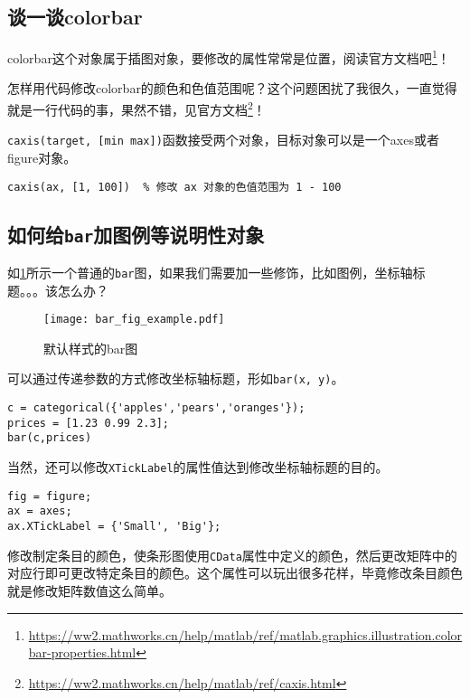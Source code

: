 \subsection{谈一谈colorbar}

colorbar这个对象属于插图对象，要修改的属性常常是位置，阅读官方文档吧\footnote{\url{https://ww2.mathworks.cn/help/matlab/ref/matlab.graphics.illustration.colorbar-properties.html}}！

怎样用代码修改colorbar的颜色和色值范围呢？这个问题困扰了我很久，一直觉得就是一行代码的事，果然不错，见官方文档\footnote{\url{https://ww2.mathworks.cn/help/matlab/ref/caxis.html}}！

\texttt{caxis(target, [min max])}函数接受两个对象，目标对象可以是一个axes或者figure对象。

\begin{verbatim}
caxis(ax, [1, 100])  % 修改 ax 对象的色值范围为 1 - 100
\end{verbatim}

\subsection{如何给\texttt{bar}加图例等说明性对象}

如\ref{bar_fig_example}所示一个普通的\texttt{bar}图，如果我们需要加一些修饰，比如图例，坐标轴标题。。。该怎么办？

\begin{figure}
    \centering
    \texttt{[image: bar\_fig\_example.pdf]}
    \caption{默认样式的bar图}
    \label{bar_fig_example}
\end{figure}

可以通过传递参数的方式修改坐标轴标题，形如\texttt{bar(x, y)}。

\begin{verbatim}
c = categorical({'apples','pears','oranges'});
prices = [1.23 0.99 2.3];
bar(c,prices)
\end{verbatim}

当然，还可以修改\texttt{XTickLabel}的属性值达到修改坐标轴标题的目的。

\begin{verbatim}
fig = figure;
ax = axes;
ax.XTickLabel = {'Small', 'Big'};
\end{verbatim}

修改制定条目的颜色，使条形图使用\texttt{CData}属性中定义的颜色，然后更改矩阵中的对应行即可更改特定条目的颜色。这个属性可以玩出很多花样，毕竟修改条目颜色就是修改矩阵数值这么简单。

